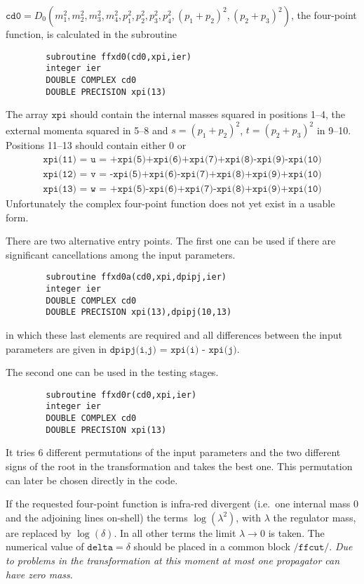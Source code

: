 \documentclass[twoside,12pt]{report}
\def\Code#1{\ensuremath{\texttt{#1}}}
\begin{document}
\begin{appendix}
$\Code{cd0} = D_0(m_1^2,m_2^2,m_3^2,m_4^2,
p_1^2,p_2^2,p_3^2,p_4^2,(p_1+p_2)^2,(p_2+p_3)^2)$, the four-point function, is 
calculated in the subroutine
\begin{verbatim}
        subroutine ffxd0(cd0,xpi,ier)
        integer ier
        DOUBLE COMPLEX cd0
        DOUBLE PRECISION xpi(13)
\end{verbatim}
The array \Code{xpi} should contain the internal masses squared in positions 
1--4, the external momenta squared in 5--8 and $s = (p_1+p_2)^2$, $t = 
(p_2+p_3)^2$ in 9--10.  Positions 11--13 should contain either 0 or 
\begin{gather}
    \Code{xpi(11) = u = +xpi(5)+xpi(6)+xpi(7)+xpi(8)-xpi(9)-xpi(10)}\nonumber\\
    \Code{xpi(12) = v = -xpi(5)+xpi(6)-xpi(7)+xpi(8)+xpi(9)+xpi(10)}\nonumber\\
    \Code{xpi(13) = w = +xpi(5)-xpi(6)+xpi(7)-xpi(8)+xpi(9)+xpi(10)}\nonumber
\end{gather}
Unfortunately the complex four-point function does not yet exist in a usable 
form.

There are two alternative entry points.  The first one can be used if there 
are significant cancellations among the input parameters.
\begin{verbatim}
        subroutine ffxd0a(cd0,xpi,dpipj,ier)
        integer ier
        DOUBLE COMPLEX cd0
        DOUBLE PRECISION xpi(13),dpipj(10,13)
\end{verbatim}
in which these last elements are required and all differences between the 
input parameters are given in \Code{dpipj(i,j) = xpi(i) - xpi(j)}.

The second one can be used in the testing stages.  
\begin{verbatim}
        subroutine ffxd0r(cd0,xpi,ier)
        integer ier
        DOUBLE COMPLEX cd0
        DOUBLE PRECISION xpi(13)
\end{verbatim}
It tries 6 different permutations of the input parameters and the two 
different signs of the root in the transformation and takes the best one.  
This permutation can later be chosen directly in the code.

If the requested four-point function is infra-red divergent (i.e.\ one 
internal mass 0 and the adjoining lines on-shell) the terms $\log(\lambda^2)$, 
with $\lambda$ the regulator mass, are replaced by $\log(\delta)$.  In all 
other terms the limit $\lambda \to 0$ is taken. The numerical value of 
$\Code{delta} = \delta$ should be placed in a common block \Code{/ffcut/}.  
{\em Due to problems in the transformation at this moment at most one 
propagator can have zero mass}.


\end{appendix}
\end{document}
